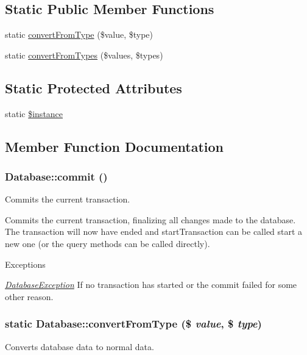 \subsection*{Static Public Member Functions}
\begin{DoxyCompactItemize}
\item 
static \hyperlink{classDatabase_a1cb4660e6675325f9ede20652ec4453d}{convertFromType} (\$value, \$type)
\item 
static \hyperlink{classDatabase_a2c45ff0539c569218940280fb4b6239d}{convertFromTypes} (\$values, \$types)
\end{DoxyCompactItemize}
\subsection*{Static Protected Attributes}
\begin{DoxyCompactItemize}
\item 
static \hyperlink{classDatabase_a313173b898c14db2a84f7fd1b14e5fb5}{\$instance}
\end{DoxyCompactItemize}


\subsection{Member Function Documentation}
\hypertarget{classDatabase_a2903b6c9ff18c27ce43fb79558bbcfee}{
\subsubsection[{commit}]{\setlength{\rightskip}{0pt plus 5cm}Database::commit ()}}
\label{classDatabase_a2903b6c9ff18c27ce43fb79558bbcfee}
Commits the current transaction.

Commits the current transaction, finalizing all changes made to the database. The transaction will now have ended and startTransaction can be called start a new one (or the query methods can be called directly).


\begin{DoxyExceptions}{Exceptions}
\item[{\em \hyperlink{classDatabaseException}{DatabaseException}}]If no transaction has started or the commit failed for some other reason. \end{DoxyExceptions}
\hypertarget{classDatabase_a1cb4660e6675325f9ede20652ec4453d}{
\subsubsection[{convertFromType}]{\setlength{\rightskip}{0pt plus 5cm}static Database::convertFromType (\$ {\em value}, \/  \$ {\em type})}}
\label{classDatabase_a1cb4660e6675325f9ede20652ec4453d}
Converts database data to normal data.


